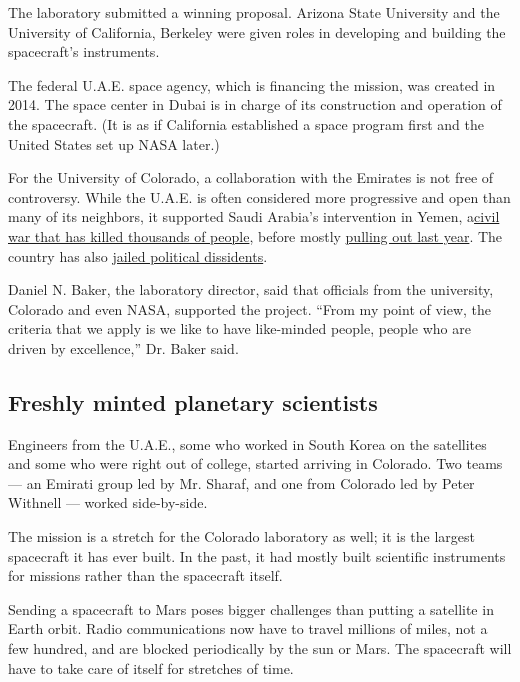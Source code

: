 The laboratory submitted a winning proposal. Arizona State University
and the University of California, Berkeley were given roles in
developing and building the spacecraft's instruments.

The federal U.A.E. space agency, which is financing the mission, was
created in 2014. The space center in Dubai is in charge of its
construction and operation of the spacecraft. (It is as if California
established a space program first and the United States set up NASA
later.)

For the University of Colorado, a collaboration with the Emirates is not
free of controversy. While the U.A.E. is often considered more
progressive and open than many of its neighbors, it supported Saudi
Arabia's intervention in Yemen,
a\href{https://www.nytimes3xbfgragh.onion/2018/08/28/world/middleeast/un-yemen-war-crimes.html}{civil
war that has killed thousands of people}, before mostly
\href{https://www.nytimes3xbfgragh.onion/2019/07/11/world/middleeast/yemen-emirates-saudi-war.html}{pulling
out last year}. The country has also
\href{https://www.justice.gov/eoir/page/file/1181666/download}{jailed
political dissidents}.

Daniel N. Baker, the laboratory director, said that officials from the
university, Colorado and even NASA, supported the project. ``From my
point of view, the criteria that we apply is we like to have like-minded
people, people who are driven by excellence,'' Dr. Baker said.

\hypertarget{freshly-minted-planetary-scientists}{%
\subsection{Freshly minted planetary
scientists}\label{freshly-minted-planetary-scientists}}

Engineers from the U.A.E., some who worked in South Korea on the
satellites and some who were right out of college, started arriving in
Colorado. Two teams --- an Emirati group led by Mr. Sharaf, and one from
Colorado led by Peter Withnell --- worked side-by-side.

The mission is a stretch for the Colorado laboratory as well; it is the
largest spacecraft it has ever built. In the past, it had mostly built
scientific instruments for missions rather than the spacecraft itself.

Sending a spacecraft to Mars poses bigger challenges than putting a
satellite in Earth orbit. Radio communications now have to travel
millions of miles, not a few hundred, and are blocked periodically by
the sun or Mars. The spacecraft will have to take care of itself for
stretches of time.

